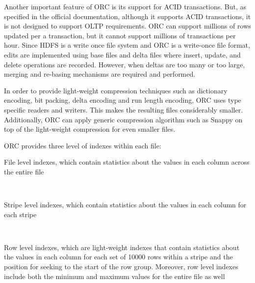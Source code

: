 \documentclass[10pt, a4paper]{report}
\begin{document}
Another important feature of ORC is its support for ACID transactions. But, as specified in the official documentation, although it supports ACID transactions, it is not designed to support OLTP requirements. ORC can support millions of rows updated per a transaction, but it cannot support millions of transactions per hour. Since HDFS is a write once file system and ORC is a write-once file format, edits are implemented using base files and delta files where insert, update, and delete operations are recorded. However, when deltas are too many or too large, merging and re-basing mechanisms are required and performed.

In order to provide light-weight compression techniques such as dictionary encoding, bit packing, delta encoding and run length encoding, ORC uses type specific readers and writers. This makes the resulting files considerably smaller. Additionally, ORC can apply generic compression algorithm such as Snappy\cite{google_snappy} on top of the light-weight compression for even smaller files.

ORC provides three level of indexes within each file: \\

\begin{itemize}
	\begin{minipage}{0.92\textwidth}
		\item File level indexes, which contain statistics about the values in each column across the entire file \\
	\end{minipage} \\
	\begin{minipage}{0.92\textwidth}
		\item Stripe level indexes, which contain statistics about the values in each column for each stripe \\
	\end{minipage} \\
	\begin{minipage}{0.92\textwidth}
		\item Row level indexes, which are light-weight indexes that contain statistics about the values in each column for each set of 10000 rows within a stripe and the position for seeking to the start of the row group. Moreover, row level indexes include both the minimum and maximum values for the entire file as well \\
	\end{minipage}
\end{itemize}
\end{document}
